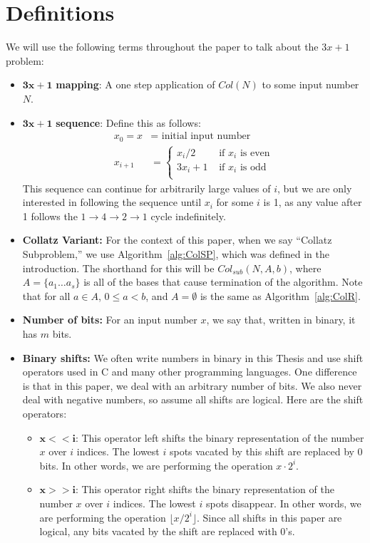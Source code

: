 \chapter{Definitions} \label{sec:defns}
We will use the following terms throughout the paper to talk about the $3x+1$ problem:
\begin{itemize}
    \item $\boldsymbol{3x+1}$\textbf{ mapping}: A one step application of $Col(N)$ to some input number $N$.
    \item $\boldsymbol{3x+1}$\textbf{ sequence}: Define this as follows: 
    \begin{align*}
        x_0 = x &= \text{ initial input number} \\
        x_{i+1} &= \begin{cases} 
        x_{i}/2 &\text{ if $x_i$ is even} \\
        3 x_{i} + 1 &\text{ if $x_i$ is odd} \\
        \end{cases}
    \end{align*}
    This sequence can continue for arbitrarily large values of $i$, but we are only interested in following the sequence until $x_i$ for some $i$ is 1, as any value after 1 follows the $1 \rightarrow 4 \rightarrow 2 \rightarrow 1$ cycle indefinitely.
    \item \textbf{Collatz Variant:} For the context of this paper, when we say ``Collatz Subproblem,'' we use Algorithm~\ref{alg:ColSP}, which was defined in the introduction. The shorthand for this will be $Col_{sub}(N,A,b)$, where $A = \{a_1 \ldots a_s\}$ is all of the bases that cause termination of the algorithm. Note that for all $a \in A$, $0 \le a < b$, and $A = \emptyset$ is the same as Algorithm~\ref{alg:ColR}.
    \item \textbf{Number of bits:} For an input number $x$, we say that, written in binary, it has $m$ bits.
    \item \textbf{Binary shifts:} We often write numbers in binary in this Thesis and use shift operators used in C and many other programming languages. One difference is that in this paper, we deal with an arbitrary number of bits. We also never deal with negative numbers, so assume all shifts are logical. Here are the shift operators:
    \begin{itemize}
        \item $\boldsymbol{x<<i}$: This operator left shifts the binary representation of the number $x$ over $i$ indices. The lowest $i$ spots vacated by this shift are replaced by 0 bits. In other words, we are performing the operation $x\cdot 2^i$.
        \item $\boldsymbol{x>>i}$: This operator right shifts the binary representation of the number $x$ over $i$ indices. The lowest $i$ spots disappear. In other words, we are performing the operation $\lfloor x / 2^i \rfloor$. Since all shifts in this paper are logical, any bits vacated by the shift are replaced with 0's.
    \end{itemize}
\end{itemize}
